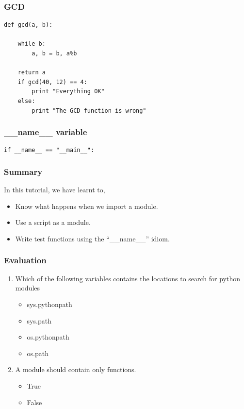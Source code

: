 \documentclass[presentation]{beamer}
\begin{document}
\begin{frame}[fragile]
\frametitle{GCD}
\label{sec-4}

\lstset{language=Python}
\begin{lstlisting}
def gcd(a, b):

    while b:
        a, b = b, a%b

    return a
    if gcd(40, 12) == 4:
        print "Everything OK"
    else:
        print "The GCD function is wrong"
\end{lstlisting}
\end{frame}
\begin{frame}[fragile]
\frametitle{\_\_name\_\_ variable}
\label{sec-5}

\lstset{language=Python}
\begin{lstlisting}
if __name__ == "__main__":
\end{lstlisting}
\end{frame}
\begin{frame}
\frametitle{Summary}
\label{sec-6}

In this tutorial, we have learnt to,


\begin{itemize}
\item Know what happens when we import a module.
\item Use a script as a module.
\item Write test functions using the ``\_\_name\_\_'' idiom.
\end{itemize}
\end{frame}
\begin{frame}
\frametitle{Evaluation}
\label{sec-7}


\begin{enumerate}
\item Which of the following variables contains the locations to search for
   python modules
\begin{itemize}
\item sys.pythonpath
\item sys.path
\item os.pythonpath
\item os.path
\end{itemize}
\vspace{8pt}
\item A module should contain only functions.
\begin{itemize}
\item True
\item False
\end{itemize}
\end{enumerate}
\end{frame}
\end{document}
